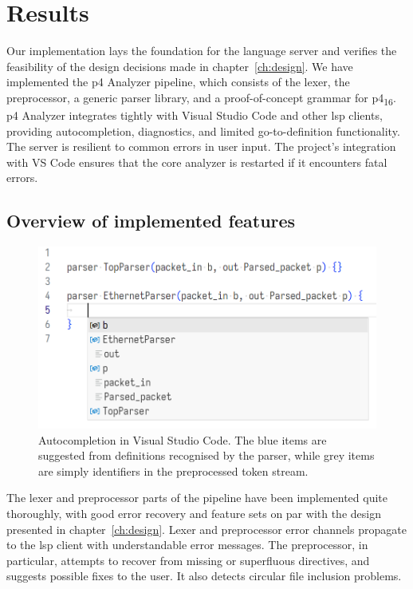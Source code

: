 \chapter{Results}

Our implementation lays the foundation for the \pfs language server and verifies
the feasibility of the design decisions made in chapter~\ref{ch:design}. We have
implemented the \acrshort{p4} Analyzer pipeline, which consists of the lexer,
the preprocessor, a generic parser library, and a proof-of-concept grammar for
\acrshort{p4}\textsubscript{16}. \acrshort{p4} Analyzer integrates tightly with
Visual Studio Code and other \acrshort{lsp} clients, providing autocompletion,
diagnostics, and limited go-to-definition functionality. The server is resilient
to common errors in user input. The project's integration with VS Code ensures
that the core analyzer is restarted if it encounters fatal errors.

\section{Overview of implemented features}

\begin{figure}[h]
	\centering
	\includegraphics[width=\textwidth]{resources/p4analyzer-autocompletion.png}
	\caption{Autocompletion in Visual Studio Code. The blue items are suggested
	from definitions recognised by the parser, while grey items are simply
	identifiers in the preprocessed token stream.}
	\label{fig:autocompletion}
\end{figure}

The lexer and preprocessor parts of the pipeline have been implemented quite
thoroughly, with good error recovery and feature sets on par with the design
presented in chapter~\ref{ch:design}. Lexer and preprocessor error channels
propagate to the \acrshort{lsp} client with understandable error messages. The
preprocessor, in particular, attempts to recover from missing or superfluous
directives, and suggests possible fixes to the user. It also detects circular
file inclusion problems.

